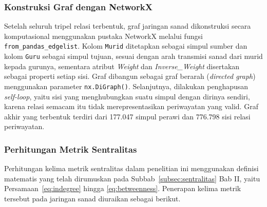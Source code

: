 \subsubsection{Konstruksi Graf dengan NetworkX}
\begin{sloppypar}
Setelah seluruh tripel relasi terbentuk, graf jaringan sanad dikonstruksi secara komputasional menggunakan pustaka NetworkX melalui fungsi \texttt{from\_pandas\_edgelist}. Kolom \texttt{Murid} ditetapkan sebagai simpul sumber dan kolom \texttt{Guru} sebagai simpul tujuan, sesuai dengan arah transmisi sanad dari murid kepada gurunya, sementara atribut \textit{Weight} dan \textit{Inverse\_Weight} disertakan sebagai properti setiap sisi. Graf dibangun sebagai graf berarah (\textit{directed graph}) menggunakan parameter \texttt{nx.DiGraph()}. Selanjutnya, dilakukan penghapusan \textit{self-loop}, yaitu sisi yang menghubungkan suatu simpul dengan dirinya sendiri, karena relasi semacam itu tidak merepresentasikan periwayatan yang valid. Graf akhir yang terbentuk terdiri dari 177.047 simpul perawi dan 776.798 sisi relasi periwayatan.
\end{sloppypar}

\subsubsection{Perhitungan Metrik Sentralitas}
\label{subsubsec:metrik-sentralitas}

Perhitungan kelima metrik sentralitas dalam penelitian ini menggunakan definisi matematis yang telah dirumuskan pada Subbab~\ref{subsec:sentralitas} Bab II, yaitu Persamaan~\eqref{eq:indegree} hingga \eqref{eq:betweenness}. Penerapan kelima metrik tersebut pada jaringan sanad diuraikan sebagai berikut.

